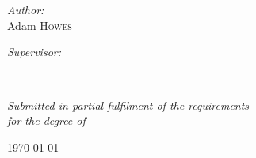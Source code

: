 \documentclass[
11pt, %
english, %
singlespacing, %
toctotoc, %
parskip, %
headsepline, %
consistentlayout, %
]{MastersDoctoralThesis} %
\author{} %
\begin{document}
\frontmatter %

\pagestyle{plain} %


\begin{titlepage}
\begin{center}

\vspace*{.06\textheight}
{\scshape\LARGE \univname\par}\vspace{1.5cm} %

\HRule \\[0.4cm] %
{\huge \bfseries \ttitle\par}\vspace{0.4cm} %
\HRule \\[1.5cm] %

 
\begin{minipage}[t]{0.4\textwidth}
\begin{flushleft} \large
\emph{Author:}\\
{Adam \textsc{Howes}} %
\end{flushleft}
\end{minipage}
\begin{minipage}[t]{0.4\textwidth}
\begin{flushright} \large
\emph{Supervisor:} \\
{\supname} %
\end{flushright}
\end{minipage}\\[3cm]
 
\vfill

\large \textit{Submitted in partial fulfilment of the requirements\\ for the degree of \degreename}\\[0.3cm] %
 
\vfill

{\large \today}\\[4cm] %
 
\vfill
\end{center}
\end{titlepage}
\end{document}
